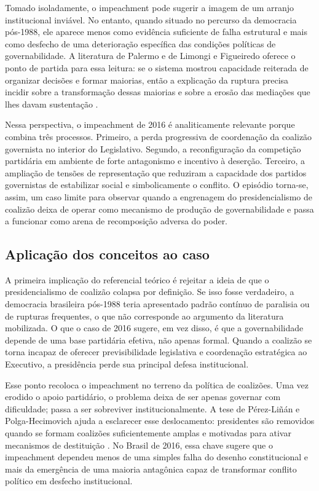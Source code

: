 \documentclass[12pt,a4paper]{article}
\begin{document}
Tomado isoladamente, o impeachment pode sugerir a imagem de um arranjo institucional inviável. No entanto, quando situado no percurso da democracia pós-1988, ele aparece menos como evidência suficiente de falha estrutural e mais como desfecho de uma deterioração específica das condições políticas de governabilidade. A literatura de Palermo e de Limongi e Figueiredo oferece o ponto de partida para essa leitura: se o sistema mostrou capacidade reiterada de organizar decisões e formar maiorias, então a explicação da ruptura precisa incidir sobre a transformação dessas maiorias e sobre a erosão das mediações que lhes davam sustentação \textcite{palermo2000_como_se} \textcite{limongi2017_a_crise}.

Nessa perspectiva, o impeachment de 2016 é analiticamente relevante porque combina três processos. Primeiro, a perda progressiva de coordenação da coalizão governista no interior do Legislativo. Segundo, a reconfiguração da competição partidária em ambiente de forte antagonismo e incentivo à deserção. Terceiro, a ampliação de tensões de representação que reduziram a capacidade dos partidos governistas de estabilizar social e simbolicamente o conflito. O episódio torna-se, assim, um caso limite para observar quando a engrenagem do presidencialismo de coalizão deixa de operar como mecanismo de produção de governabilidade e passa a funcionar como arena de recomposição adversa do poder.

\subsection{Aplicação dos conceitos ao caso}
\label{sec:org15a43bf}
A primeira implicação do referencial teórico é rejeitar a ideia de que o presidencialismo de coalizão colapsa por definição. Se isso fosse verdadeiro, a democracia brasileira pós-1988 teria apresentado padrão contínuo de paralisia ou de rupturas frequentes, o que não corresponde ao argumento da literatura mobilizada. O que o caso de 2016 sugere, em vez disso, é que a governabilidade depende de uma base partidária efetiva, não apenas formal. Quando a coalizão se torna incapaz de oferecer previsibilidade legislativa e coordenação estratégica ao Executivo, a presidência perde sua principal defesa institucional.

Esse ponto recoloca o impeachment no terreno da política de coalizões. Uma vez erodido o apoio partidário, o problema deixa de ser apenas governar com dificuldade; passa a ser sobreviver institucionalmente. A tese de Pérez-Liñán e Polga-Hecimovich ajuda a esclarecer esse deslocamento: presidentes são removidos quando se formam coalizões suficientemente amplas e motivadas para ativar mecanismos de destituição \textcite{perez_lian2016_explaining_military}. No Brasil de 2016, essa chave sugere que o impeachment dependeu menos de uma simples falha do desenho constitucional e mais da emergência de uma maioria antagônica capaz de transformar conflito político em desfecho institucional.
\end{document}
